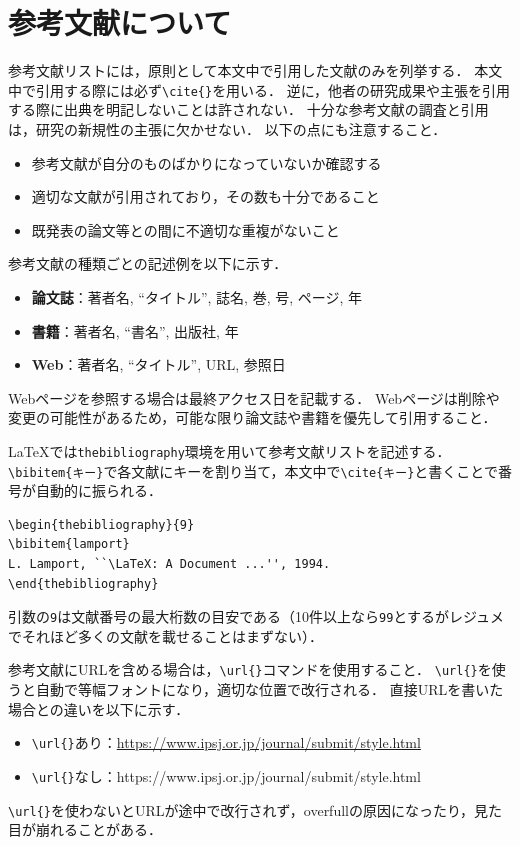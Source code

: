 \section{参考文献について}
\label{sec:reference}

参考文献リストには，原則として本文中で引用した文献のみを列挙する．
本文中で引用する際には必ず\verb|\cite{}|を用いる．
逆に，他者の研究成果や主張を引用する際に出典を明記しないことは許されない．
十分な参考文献の調査と引用は，研究の新規性の主張に欠かせない．
以下の点にも注意すること．
\begin{itemize}
    \item 参考文献が自分のものばかりになっていないか確認する
    \item 適切な文献が引用されており，その数も十分であること
    \item 既発表の論文等との間に不適切な重複がないこと
\end{itemize}

参考文献の種類ごとの記述例を以下に示す．
\begin{itemize}
    \item \textbf{論文誌}：著者名, ``タイトル'', 誌名, 巻, 号, ページ, 年\cite{lamport}
    \item \textbf{書籍}：著者名, ``書名'', 出版社, 年\cite{tex}
    \item \textbf{Web}：著者名, ``タイトル'', URL, 参照日\cite{ipsj-sample}
\end{itemize}
Webページを参照する場合は最終アクセス日を記載する．
Webページは削除や変更の可能性があるため，可能な限り論文誌や書籍を優先して引用すること．

\LaTeX では\texttt{thebibliography}環境を用いて参考文献リストを記述する．
\verb|\bibitem{キー}|で各文献にキーを割り当て，本文中で\verb|\cite{キー}|と書くことで番号が自動的に振られる．
\begin{lstlisting}[language={[LaTeX]TeX}, numbers=none, frame=single]
\begin{thebibliography}{9}
\bibitem{lamport}
L. Lamport, ``\LaTeX: A Document ...'', 1994.
\end{thebibliography}
\end{lstlisting}
引数の\texttt{9}は文献番号の最大桁数の目安である（10件以上なら\texttt{99}とするがレジュメでそれほど多くの文献を載せることはまずない）．

参考文献にURLを含める場合は，\verb|\url{}|コマンドを使用すること．
\verb|\url{}|を使うと自動で等幅フォントになり，適切な位置で改行される．
直接URLを書いた場合との違いを以下に示す．
\begin{itemize}
    \item \verb|\url{}|あり：\url{https://www.ipsj.or.jp/journal/submit/style.html}
    \item \verb|\url{}|なし：https://www.ipsj.or.jp/journal/submit/style.html
\end{itemize}
\verb|\url{}|を使わないとURLが途中で改行されず，overfullの原因になったり，見た目が崩れることがある．

